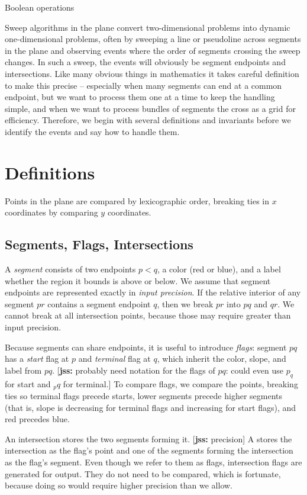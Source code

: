 \documentclass[11pt]{article}
\def\jss#1{{\footnotesize [{\bf jss:} #1]}}
\begin{document}
Boolean operations

Sweep algorithms in the plane convert two-dimensional problems into dynamic one-dimensional problems,
often by sweeping a line or pseudoline across segments in the
plane and observing events where the order of segments crossing the sweep changes.
In such a sweep,  the events will obviously be segment endpoints and intersections. Like many obvious things in mathematics it takes careful definition to make this precise -- especially when many segments can end at a common endpoint, but we want to process them one at a time to keep the handling simple, and when we want to process bundles of segments the cross as a grid for efficiency.  
Therefore, we begin with several definitions and invariants before we identify the events and say how to handle them. 

\section{Definitions}
Points in the plane are compared by lexicographic order, breaking ties in $x$ coordinates by comparing $y$ coordinates.

\subsection{Segments, Flags, Intersections}
A \textit{segment} consists of two endpoints $p<q$, a color (red or blue), and
a label whether the region it bounds is above or below. 
We assume that segment endpoints are represented exactly in {\it input precision}.
If the relative interior of any segment $pr$ contains a segment endpoint $q$, 
then we break $pr$ into $pq$ and $qr$. We cannot break at all intersection points, 
because those may require greater than input precision. 

Because segments can share endpoints, it is useful to introduce \textit{flags}: 
segment $pq$ has a \textit{start} flag at $p$ and \textit{terminal} flag at $q$, 
which inherit the color, slope, and label from $pq$. 
\jss{probably need notation for the flags of $pq$: could even use $p_q$ for start and $_pq$ for terminal.}
To compare flags, we compare the points, breaking ties so terminal flags precede starts, 
lower segments precede higher segments (that is, slope is decreasing for terminal flags and increasing for start flags), and red precedes blue.

An intersection stores the two segments forming it.  \jss{precision}
A  stores the intersection as the flag's point and one of the segments forming the intersection as the flag's segment.  
Even though we refer to them as flags,  intersection flags are generated for output.  They do not need to be compared, which is fortunate, because doing so would require higher precision than we allow.
\end{document}
